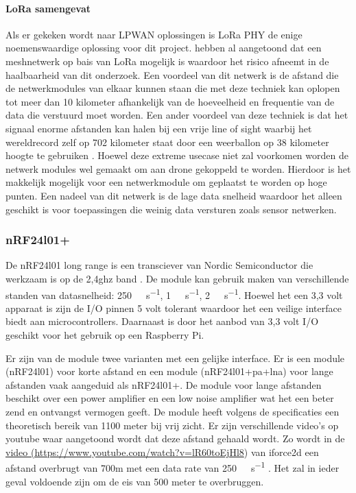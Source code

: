 \documentclass[a4paper, 11pt, oneside]{report}
\begin{document}
\paragraph*{LoRa samengevat}
Als er gekeken wordt naar LPWAN oplossingen is LoRa PHY de enige noemenswaardige oplossing voor dit project.
 hebben al aangetoond dat een meshnetwerk op bais van LoRa mogelijk is waardoor het risico afneemt in de haalbaarheid van dit onderzoek.
Een voordeel van dit netwerk is de afstand die de netwerkmodules van elkaar kunnen staan die met deze techniek kan oplopen tot meer dan 10 kilometer afhankelijk van de hoeveelheid en frequentie van de data die verstuurd moet worden.
Een ander voordeel van deze techniek is dat het signaal enorme afstanden kan halen bij een vrije line of sight waarbij het wereldrecord zelf op 702 kilometer staat door een weerballon op 38 kilometer hoogte te gebruiken \cite{LoRARecord}.
Hoewel deze extreme usecase niet zal voorkomen worden de netwerk modules wel gemaakt om aan drone gekoppeld te worden.
Hierdoor is het makkelijk mogelijk voor een netwerkmodule om geplaatst te worden op hoge punten. 
Een nadeel van dit netwerk is de lage data snelheid waardoor het alleen geschikt is voor toepassingen die weinig data versturen zoals sensor netwerken.

\subsubsection{nRF24l01+}\label{sec:nrf24l01}
De nRF24l01 long range is een transciever van Nordic Semiconductor die werkzaam is op de 2,4ghz band \cite{nRFspec}.
De module kan gebruik maken van verschillende standen van datasnelheid: \SI{250}{\kilo\bit\per\second}, \SI{1}{\mega\bit\per\second}, \SI{2}{\mega\bit\per\second}.
Hoewel het een 3,3 volt apparaat is zijn de I/O pinnen 5 volt tolerant waardoor het een veilige interface biedt aan microcontrollers. Daarnaast is door het aanbod van 3,3 volt I/O geschikt voor het gebruik op een Raspberry Pi.

Er zijn van de module twee varianten met een gelijke interface. 
Er is een module (nRF24l01) voor korte afstand en een module (nRF24l01+pa+lna) voor lange afstanden vaak aangeduid als nRF24l01+.
De module voor lange afstanden beschikt over een power amplifier en een low noise amplifier wat het een beter zend en ontvangst vermogen geeft.
De module heeft volgens de specificaties een theoretisch bereik van 1100 meter bij vrij zicht.
Er zijn verschillende video's op youtube waar aangetoond wordt dat deze afstand gehaald wordt.
Zo wordt in de \href{https://www.youtube.com/watch?v=lR60toEjHl8}{video (https://www.youtube.com/watch?v=lR60toEjHl8}) van iforce2d een afstand overbrugt van 700m met een data rate van \SI{250}{\kilo\bit\per\second} \cite{nrfAfstand}.
Het zal in ieder geval voldoende zijn om de eis van 500 meter te overbruggen.  
\end{document}
